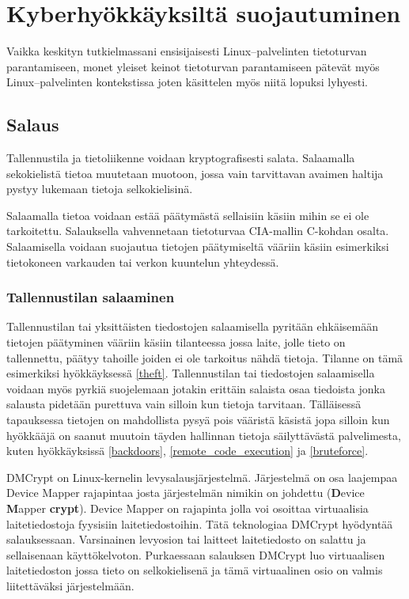\chapter{Kyberhyökkäyksiltä suojautuminen}\label{suojautuminen}

Vaikka keskityn tutkielmassani ensisijaisesti Linux–palvelinten tietoturvan parantamiseen, monet yleiset keinot tietoturvan parantamiseen pätevät myös Linux–palvelinten kontekstissa joten käsittelen myös niitä lopuksi lyhyesti.

\section{Salaus}\label{Salaus}
Tallennustila ja tietoliikenne voidaan kryptografisesti salata. Salaamalla sekokielistä tietoa muutetaan muotoon, jossa vain tarvittavan avaimen haltija pystyy lukemaan tietoja selkokielisinä.

Salaamalla tietoa voidaan estää päätymästä sellaisiin käsiin mihin se ei ole tarkoitettu. Salauksella vahvennetaan tietoturvaa CIA-mallin C-kohdan osalta. Salaamisella voidaan suojautua tietojen päätymiseltä vääriin käsiin esimerkiksi tietokoneen varkauden tai verkon kuuntelun yhteydessä.

\subsection{Tallennustilan salaaminen}\label{tallennustilan_salaaminen}
Tallennustilan tai yksittäisten tiedostojen salaamisella pyritään ehkäisemään tietojen päätyminen vääriin käsiin tilanteessa jossa laite, jolle tieto on tallennettu, päätyy tahoille joiden ei ole tarkoitus nähdä tietoja. Tilanne on tämä esimerkiksi hyökkäyksessä \ref{theft}. Tallennustilan tai tiedostojen salaamisella voidaan myös pyrkiä suojelemaan jotakin erittäin salaista osaa tiedoista jonka salausta pidetään purettuva vain silloin kun tietoja tarvitaan. Tälläisessä tapauksessa tietojen on mahdollista pysyä pois vääristä käsistä jopa silloin kun hyökkääjä on saanut muutoin täyden hallinnan tietoja säilyttävästä palvelimesta, kuten hyökkäyksissä \ref{backdoors}, \ref{remote_code_execution} ja \ref{bruteforce}.

DMCrypt on Linux-kernelin levysalausjärjestelmä. Järjestelmä on osa laajempaa Device Mapper rajapintaa josta järjestelmän nimikin on johdettu (\textbf{D}evice \textbf{M}apper \textbf{crypt}). Device Mapper on rajapinta jolla voi osoittaa virtuaalisia laitetiedostoja fyysisiin laitetiedostoihin. Tätä teknologiaa DMCrypt hyödyntää salauksessaan. Varsinainen levyosion tai laitteet laitetiedosto on salattu ja sellaisenaan käyttökelvoton. Purkaessaan salauksen DMCrypt luo virtuaalisen laitetiedoston jossa tieto on selkokielisenä ja tämä virtuaalinen osio on valmis liitettäväksi järjestelmään.

